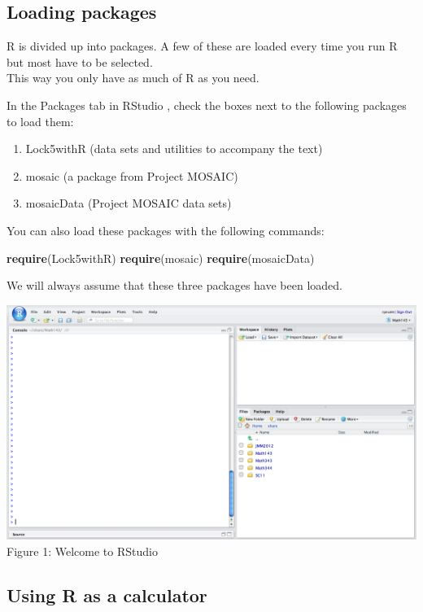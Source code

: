 \documentclass[]{book}
\newenvironment{Shaded}{\begin{snugshade}}{\end{snugshade}}
\newcommand{\KeywordTok}[1]{\textcolor[rgb]{0.13,0.29,0.53}{\textbf{#1}}}
\newcommand{\NormalTok}[1]{#1}
\providecommand{\tightlist}{%
  \setlength{\itemsep}{0pt}\setlength{\parskip}{0pt}}
\begin{document}
\hypertarget{loading-packages}{%
\subsection{Loading packages}\label{loading-packages}}

R is divided up into packages. A few of these are loaded every time you run R but most have to be selected.\\
This way you only have as much of R as you need.

In the {Packages} tab in RStudio ,
check the boxes next to the following packages to load them:

\begin{enumerate}
\tightlist
\item
  Lock5withR (data sets and utilities to accompany the text)
\item
  mosaic (a package from Project MOSAIC)
\item
  mosaicData (Project MOSAIC data sets)
\end{enumerate}

You can also load these packages with the following commands:

\begin{Shaded}
\begin{Highlighting}[]
\KeywordTok{require}\NormalTok{(Lock5withR)}
\KeywordTok{require}\NormalTok{(mosaic)}
\KeywordTok{require}\NormalTok{(mosaicData)}
\end{Highlighting}
\end{Shaded}

We will always assume that these three packages have been loaded.

\includegraphics{images/RStudio-Welcome.png}
Figure 1: Welcome to RStudio

\hypertarget{using-r-as-a-calculator}{%
\subsection{Using R as a calculator}\label{using-r-as-a-calculator}}
\end{document}
